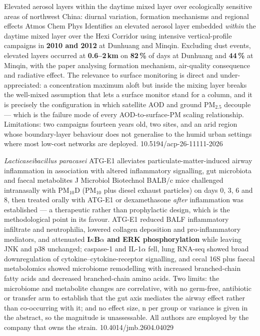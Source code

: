 \documentclass[10pt]{article}
\begin{document}
{Elevated aerosol layers within the daytime mixed layer over ecologically sensitive areas
of northwest China: diurnal variation, formation mechanisms and regional effects}
{Atmos Chem Phys}
{Identifies an elevated aerosol layer embedded \emph{within} the daytime mixed layer over
the Hexi Corridor using intensive vertical-profile campaigns in \textbf{2010 and 2012} at
Dunhuang and Minqin. Excluding dust events, elevated layers occurred at
\textbf{0.6--2\,km} on \textbf{82\,\%} of days at Dunhuang and \textbf{44\,\%} at Minqin,
with the paper analysing formation mechanism, air-quality consequence and radiative
effect. The relevance to surface monitoring is direct and under-appreciated: a
concentration maximum aloft but inside the mixing layer breaks the well-mixed assumption
that lets a surface monitor stand for a column, and it is precisely the configuration in
which satellite AOD and ground PM$_{2.5}$ decouple --- which is the failure mode of every
AOD-to-surface-PM scaling relationship. Limitations: two campaigns fourteen years old, two
sites, and an arid region whose boundary-layer behaviour does not generalise to the humid
urban settings where most low-cost networks are deployed.}
{10.5194/acp-26-11111-2026}


{\textit{Lacticaseibacillus paracasei} ATG-E1 alleviates particulate-matter-induced airway
inflammation in association with altered inflammatory signalling, gut microbiota and
faecal metabolites}
{J Microbiol Biotechnol}
{BALB/c mice challenged intranasally with PM$_{10}$D (PM$_{10}$ plus diesel exhaust
particles) on days 0, 3, 6 and 8, then treated orally with ATG-E1 or dexamethasone
\emph{after} inflammation was established --- a therapeutic rather than prophylactic
design, which is the methodological point in its favour. ATG-E1 reduced BALF inflammatory
infiltrate and neutrophilia, lowered collagen deposition and pro-inflammatory mediators,
and attenuated \textbf{I$\kappa$B$\alpha$ and ERK phosphorylation} while leaving JNK and
p38 unchanged; caspase-1 and IL-1$\alpha$ fell, lung RNA-seq showed broad downregulation
of cytokine--cytokine-receptor signalling, and cecal 16S plus faecal metabolomics showed
microbiome remodelling with increased branched-chain fatty acids and decreased
branched-chain amino acids. Two limits: the microbiome and metabolite changes are
correlative, with no germ-free, antibiotic or transfer arm to establish that the gut axis
mediates the airway effect rather than co-occurring with it; and no effect size, n per
group or variance is given in the abstract, so the magnitude is unassessable. All authors
are employed by the company that owns the strain.}
{10.4014/jmb.2604.04029}
\end{document}
